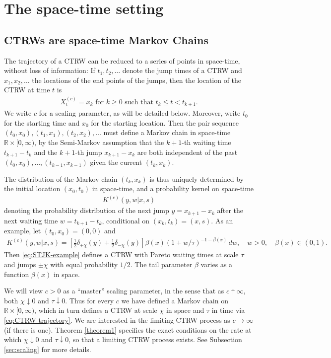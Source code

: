 \documentclass[a4paper,12pt]{elsarticle}
\numberwithin{equation}{section}
\theoremstyle{plain}
\theoremstyle{definition}
\theoremstyle{remark}
\numberwithin{equation}{section}
\newcommand{\spc}{\mathbb R}
\newcommand{\spctim}{\spc \times [0,\infty)}
\newcommand{\1}{\mathbf 1}
\begin{document}
\section{The space-time setting}

\subsection{CTRWs are space-time Markov Chains}

The trajectory of a CTRW can be reduced to a series of points in
space-time, without loss of information: If $t_1, t_2, \ldots$
denote the jump times of a CTRW and $x_1, x_2, \ldots$ the locations
of the end points of the jumps, then the location of the CTRW at time
$t$ is
\begin{align} \label{eq:CTRW-trajectory}
X^{(c)}_t = x_k \text{ for } k \ge 0 \text{ such that }
t_k \le t < t_{k+1}.
\end{align}
We write $c$ for a scaling parameter, as will be detailed below.
Moreover, write $t_0$ for the starting time and $x_0$ for the starting
location. Then the pair sequence
$(t_0, x_0), (t_1, x_1), (t_2, x_2), \ldots$
must define a Markov chain in space-time $\spctim$,
by the Semi-Markov assumption that the $k+1$-th waiting time $t_{k+1} - t_k$
and the $k+1$-th jump $x_{k+1} - x_k$ are both independent of the past
$(t_0, x_0), \ldots, (t_{k-1}, x_{k-1})$ given the current $(t_k, x_k)$.

The distribution of the Markov chain $(t_k, x_k)$ is thus uniquely
determined by the initial location $(x_0, t_0)$ in space-time,
and a probability kernel on space-time
\begin{align} \label{eq:STJK}
K^{(c)}(y,w | x,s)
\end{align}
denoting the probability distribution of the next jump 
$y = x_{k+1} - x_k$ after the next waiting time
$w = t_{k+1} - t_k$, conditional on $(x_k, t_k) = (x,s)$.
As an example, let $(t_0, x_0) = (0,0)$ and
\begin{align} \label{eq:STJK-example}
K^{(c)}(y,w | x,s) = \left[\frac{1}{2} \delta_{+\chi}(y) + \frac{1}{2} \delta_{-\chi}(y)\right] \beta(x) (1+w/\tau)^{-1-\beta(x)} \, dw,
\quad w > 0, \quad \beta(x) \in (0,1).
\end{align}
Then \eqref{eq:STJK-example} defines a CTRW with Pareto waiting times at scale
$\tau$ and jumps $\pm \chi$ with equal probability $1/2$.  The tail parameter 
$\beta$ varies as a function $\beta(x)$ in space. 


We will view $c > 0$ as a ``master'' scaling parameter, 
in the sense that as $c \uparrow \infty$, both $\chi \downarrow 0$ and 
$\tau \downarrow 0$. 
Thus for every $c$ we have defined a Markov chain on $\spctim$, which
in turn defines a CTRW at scale $\chi$ in space and $\tau$ in time
via \eqref{eq:CTRW-trajectory}.
We are interested in the limiting CTRW process as $c \to \infty$ (if there 
is one).
Theorem \ref{theorem1} specifies the exact conditions on the rate at 
which $\chi \downarrow 0$ and $\tau \downarrow 0$, so that a limiting 
CTRW process exists. 
See Subsection \ref{sec:scaling} for more details. 
\end{document}
